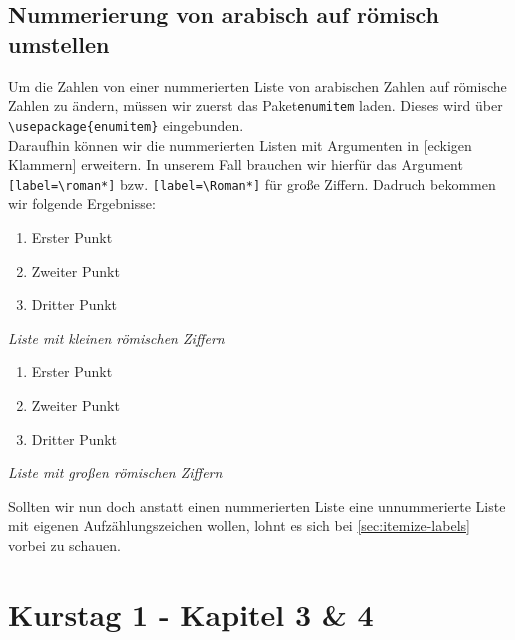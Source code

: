 \documentclass[
12pt,
ngerman
]{scrreprt}
\begin{document}
\section{Nummerierung von arabisch auf römisch umstellen}
\label{sec:enum-label}
Um die Zahlen von einer nummerierten Liste von arabischen Zahlen auf römische Zahlen zu ändern, müssen wir zuerst das Paket\verb!enumitem! laden. Dieses wird über \verb!\usepackage{enumitem}! eingebunden. \\
Daraufhin können wir die nummerierten Listen mit Argumenten in [eckigen Klammern] erweitern. In unserem Fall brauchen wir hierfür das Argument \verb![label=\roman*]! bzw. \verb![label=\Roman*]! für große Ziffern. Dadruch bekommen wir folgende Ergebnisse:
\begin{multicols}{2}
  \begin{enumerate}[label=\roman*]
    \item Erster Punkt
    \item Zweiter Punkt
    \item Dritter Punkt
  \end{enumerate}
  \emph{Liste mit kleinen römischen Ziffern}
  \begin{enumerate}[label=\Roman*]
    \item Erster Punkt
    \item Zweiter Punkt
    \item Dritter Punkt
  \end{enumerate}
  \emph{Liste mit großen römischen Ziffern}
\end{multicols}
Sollten wir nun doch anstatt einen nummerierten Liste eine unnummerierte Liste mit eigenen Aufzählungszeichen wollen, lohnt es sich bei \cref{sec:itemize-labels} vorbei zu schauen.

\chapter[Blatt 2]{Kurstag 1 - Kapitel 3 \& 4}
\label{cha:chap3-4}
\label{blatt:2}
\end{document}
